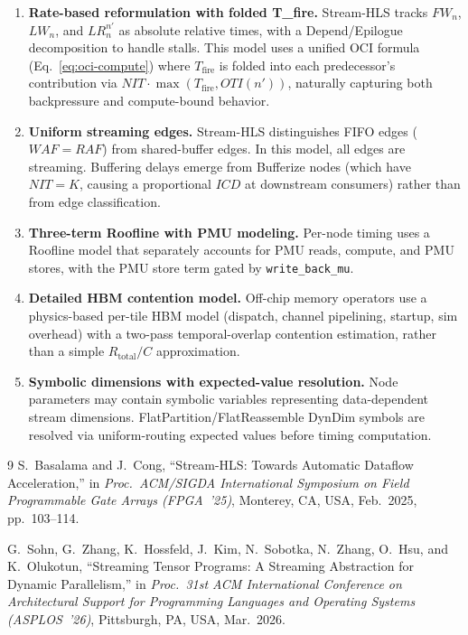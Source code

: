 \documentclass[10pt]{article}
\begin{document}
\begin{enumerate}[label=(\roman*)]
    \item \textbf{Rate-based reformulation with folded T\_fire.} Stream-HLS tracks $FW_n$, $LW_n$, and $LR^{n'}_n$ as absolute relative times, with a Depend/Epilogue decomposition to handle stalls. This model uses a unified OCI formula (Eq.~\ref{eq:oci-compute}) where $T_{\text{fire}}$ is folded into each predecessor's contribution via $\mathit{NIT} \cdot \max(T_{\text{fire}}, \mathit{OTI}(n'))$, naturally capturing both backpressure and compute-bound behavior.

    \item \textbf{Uniform streaming edges.} Stream-HLS distinguishes FIFO edges ($WAF = RAF$) from shared-buffer edges. In this model, all edges are streaming. Buffering delays emerge from Bufferize nodes (which have $\mathit{NIT} = K$, causing a proportional $\mathit{ICD}$ at downstream consumers) rather than from edge classification.

    \item \textbf{Three-term Roofline with PMU modeling.} Per-node timing uses a Roofline model that separately accounts for PMU reads, compute, and PMU stores, with the PMU store term gated by \texttt{write\_back\_mu}.

    \item \textbf{Detailed HBM contention model.} Off-chip memory operators use a physics-based per-tile HBM model (dispatch, channel pipelining, startup, sim overhead) with a two-pass temporal-overlap contention estimation, rather than a simple $R_{\text{total}} / C$ approximation.

    \item \textbf{Symbolic dimensions with expected-value resolution.} Node parameters may contain symbolic variables representing data-dependent stream dimensions. FlatPartition/FlatReassemble DynDim symbols are resolved via uniform-routing expected values before timing computation.
\end{enumerate}

\begin{thebibliography}{9}
S.~Basalama and J.~Cong, ``Stream-HLS: Towards Automatic Dataflow Acceleration,'' in \emph{Proc.\ ACM/SIGDA International Symposium on Field Programmable Gate Arrays (FPGA~'25)}, Monterey, CA, USA, Feb.\ 2025, pp.~103--114.

G.~Sohn, G.~Zhang, K.~Hossfeld, J.~Kim, N.~Sobotka, N.~Zhang, O.~Hsu, and K.~Olukotun, ``Streaming Tensor Programs: A Streaming Abstraction for Dynamic Parallelism,'' in \emph{Proc.\ 31st ACM International Conference on Architectural Support for Programming Languages and Operating Systems (ASPLOS~'26)}, Pittsburgh, PA, USA, Mar.\ 2026.
\end{thebibliography}
\end{document}
